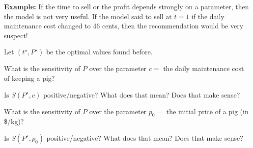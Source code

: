\documentclass{workbook}
\begin{document}
\begin{slide}


\textbf{Example:} If the time to sell or the profit depends strongly on a parameter, then the model is not very useful.
If the model said to sell at $t=1$ if the daily maintenance cost changed to 46 cents, then the recommendation would be very suspect!

\begin{parts}
\setcounter{partsitem}{4}

	\item Let $(t^\star,P^\star)$ be the optimal values found before. 
	
	What is the sensitivity of $P$ over the parameter $c=$ the daily maintenance cost of keeping a pig?
	
	\item Is $S(P^\star,c)$ positive/negative? What does that mean? Does that make sense?
	
	\item What is the sensitivity of $P$ over the parameter $p_0=$ the initial price of a pig (in \$/kg)?

	\item Is $S(P^\star,p_0)$ positive/negative? What does that mean? Does that make sense?

\end{parts}

\end{slide}
\end{document}
